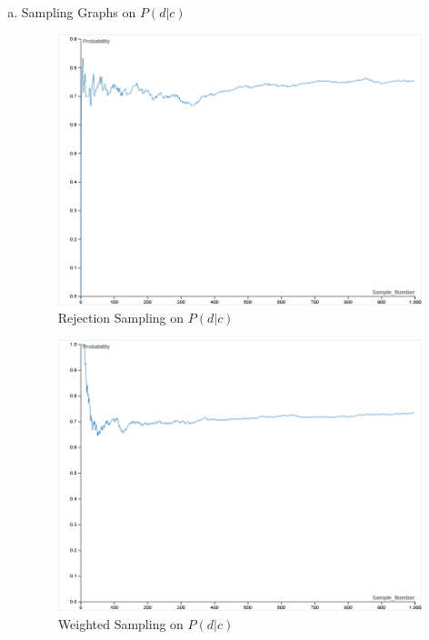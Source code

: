 \documentclass{article}
\begin{document}
\begin{enumerate}[a)]
    \newpage
    \item Sampling Graphs on $P(d|c)$\\
        \begin{figure}[H]
            \centering
            \includegraphics[width=\linewidth]{images/rejection_graph.png}
            \caption{Rejection Sampling on $P(d|c)$}
            \label{fig:rejection_graph}
        \end{figure}
        
        \begin{figure}[H]
            \centering
            \includegraphics[width=\linewidth]{images/weighted_graph.png}
            \caption{Weighted Sampling on $P(d|c)$}
            \label{fig:weighted_graph}
        \end{figure}


\end{enumerate}
\end{document}
